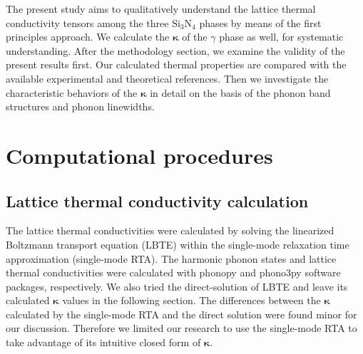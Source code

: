 \documentclass[twocolumn,amsmath,amssymb,a4paper,prb,superscriptaddress,floatfix]{revtex4-1}
\begin{document}
The present study aims to qualitatively understand the lattice thermal
conductivity tensors among the three Si$_3$N$_4$ phases by means of the first
principles approach.  We calculate the $\boldsymbol{\kappa}$ of the $\gamma$
phase as well, for systematic understanding. After the methodology section, we
examine the validity of the present results first.  Our calculated thermal
properties are compared with the available experimental and theoretical
references.  Then we investigate the characteristic behaviors of the 
$\boldsymbol{\kappa}$ in detail on the basis of the phonon band structures and
phonon linewidths.

\section{Computational procedures}

\subsection{Lattice thermal conductivity calculation}

The lattice thermal conductivities were calculated by solving the linearized
Boltzmann transport equation (LBTE) within the single-mode relaxation time
approximation (single-mode RTA).  The harmonic phonon states and lattice thermal conductivities were
calculated with phonopy\cite{phonopy} and phono3py\cite{phono3py} software packages, respectively.
We also tried the
direct-solution of LBTE\cite{chaput-direct} and leave its calculated
$\boldsymbol{\kappa}$ values in the following section. The differences between
the $\boldsymbol{\kappa}$ calculated by the single-mode RTA and the direct
solution were found minor for our discussion. Therefore we limited our research
to use the single-mode RTA to take advantage of its intuitive closed form of
$\boldsymbol{\kappa}$.
\end{document}

